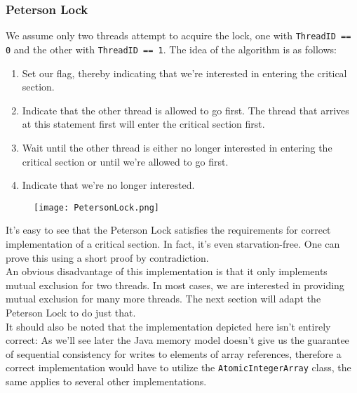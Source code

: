 \documentclass[main]{subfiles}
\begin{document}
\subsubsection{Peterson Lock} \label{Peterson's Lock}
We assume only two threads attempt to acquire the lock, one with \texttt{ThreadID == 0} and the other with \texttt{ThreadID == 1}. The idea of the algorithm is as follows:
\begin{enumerate}
    \item Set our flag, thereby indicating that we're interested in entering the critical section.
    \item Indicate that the other thread is allowed to go first. The thread that arrives at this statement first will enter the critical section first.
    \item Wait until the other thread is either no longer interested in entering the critical section or until we're allowed to go first.
    \item Indicate that we're no longer interested.
\end{enumerate}
\begin{figure}[H]
    \centering
    \texttt{[image: PetersonLock.png]}
\end{figure}
It's easy to see that the Peterson Lock satisfies the requirements for correct implementation of a critical section. In fact, it's even starvation-free. One can prove this using a short proof by contradiction.\\[3mm]
An obvious disadvantage of this implementation is that it only implements mutual exclusion for two threads. In most cases, we are interested in providing mutual exclusion for many more threads. The next section will adapt the Peterson Lock to do just that.\\
It should also be noted that the implementation depicted here isn't entirely correct: As we'll see later the Java memory model doesn't give us the guarantee of sequential consistency for writes to elements of array references, therefore a correct implementation would have to utilize the \texttt{AtomicIntegerArray} class, the same applies to several other implementations.

\end{document}
